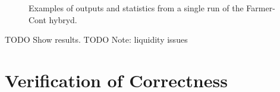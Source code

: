 \documentclass[runningheads]{llncs}
\begin{document}
\begin{figure}[htbp]
\begin{center}
{      \quad
      \quad
      }
    \caption{Examples of outputs and statistics from a single run of the Farmer-Cont hybryd.}
    \label{fig:ContLargeSSim}
  \end{center}
\end{figure}


TODO Show results.
TODO Note: liquidity issues



\section{Verification of Correctness}
\end{document}
